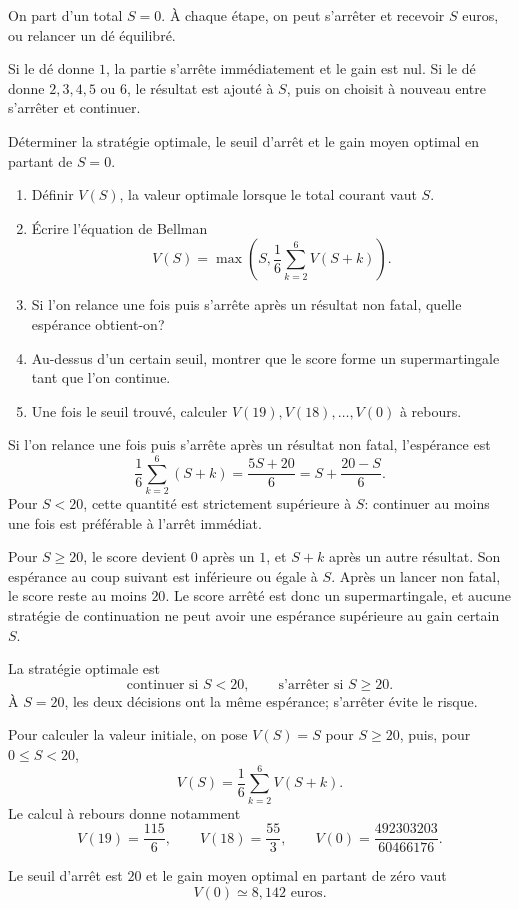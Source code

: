 \documentclass[11pt,a4paper]{article}
\begin{document}

\begin{statementbox}
On part d'un total $S=0$. À chaque étape, on peut s'arrêter et recevoir $S$
euros, ou relancer un dé équilibré.

Si le dé donne $1$, la partie s'arrête immédiatement et le gain est nul. Si le
dé donne $2,3,4,5$ ou $6$, le résultat est ajouté à $S$, puis on choisit à
nouveau entre s'arrêter et continuer.

Déterminer la stratégie optimale, le seuil d'arrêt et le gain moyen optimal en
partant de $S=0$.
\end{statementbox}

\begin{hintsbox}
\begin{enumerate}
  \item Définir $V(S)$, la valeur optimale lorsque le total courant vaut $S$.
  \item Écrire l'équation de Bellman
  \[
  V(S)=\max\left(S,\frac16\sum_{k=2}^{6}V(S+k)\right).
  \]
  \item Si l'on relance une fois puis s'arrête après un résultat non fatal,
  quelle espérance obtient-on?
  \item Au-dessus d'un certain seuil, montrer que le score forme un
  supermartingale tant que l'on continue.
  \item Une fois le seuil trouvé, calculer $V(19),V(18),\ldots,V(0)$ à rebours.
\end{enumerate}
\end{hintsbox}

\correction

Si l'on relance une fois puis s'arrête après un résultat non fatal, l'espérance
est
\[
\frac16\sum_{k=2}^{6}(S+k)
=\frac{5S+20}{6}
=S+\frac{20-S}{6}.
\]
Pour $S<20$, cette quantité est strictement supérieure à $S$: continuer au
moins une fois est préférable à l'arrêt immédiat.

Pour $S\geq20$, le score devient $0$ après un $1$, et $S+k$ après un autre
résultat. Son espérance au coup suivant est inférieure ou égale à $S$. Après
un lancer non fatal, le score reste au moins $20$. Le score arrêté est donc un
supermartingale, et aucune stratégie de continuation ne peut avoir une
espérance supérieure au gain certain $S$.

\begin{keyideabox}
La stratégie optimale est
\[
\boxed{\text{continuer si }S<20,\qquad\text{s'arrêter si }S\geq20.}
\]
À $S=20$, les deux décisions ont la même espérance; s'arrêter évite le risque.
\end{keyideabox}

Pour calculer la valeur initiale, on pose $V(S)=S$ pour $S\geq20$, puis, pour
$0\leq S<20$,
\[
V(S)=\frac16\sum_{k=2}^{6}V(S+k).
\]
Le calcul à rebours donne notamment
\[
V(19)=\frac{115}{6},\qquad
V(18)=\frac{55}{3},\qquad
V(0)=\frac{492303203}{60466176}.
\]

\begin{resultbox}
Le seuil d'arrêt est $20$ et le gain moyen optimal en partant de zéro vaut
\[
\boxed{V(0)\simeq 8{,}142\text{ euros}.}
\]
\end{resultbox}
\end{document}
